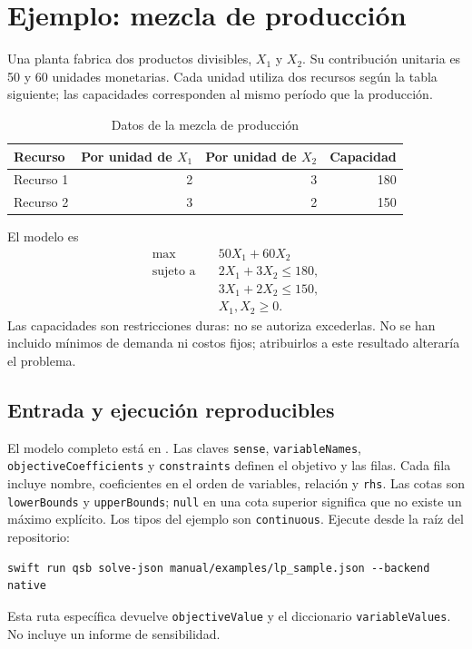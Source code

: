 \section{Ejemplo: mezcla de producción}
Una planta fabrica dos productos divisibles, \(X_1\) y \(X_2\). Su contribución
unitaria es 50 y 60 unidades monetarias. Cada unidad utiliza dos recursos según
la tabla siguiente; las capacidades corresponden al mismo período que la
producción.
\begin{table}[htbp]
\centering
\caption{Datos de la mezcla de producción}
\begin{tabular}{lrrr}
\toprule
Recurso & Por unidad de \(X_1\) & Por unidad de \(X_2\) & Capacidad \\
\midrule
Recurso 1 & 2 & 3 & 180 \\
Recurso 2 & 3 & 2 & 150 \\
\bottomrule
\end{tabular}
\end{table}
El modelo es
\[
\begin{aligned}
 \max\quad &50X_1+60X_2\\
 \text{sujeto a}\quad &2X_1+3X_2\leq180,\\
 &3X_1+2X_2\leq150,\\
 &X_1,X_2\geq0.
\end{aligned}
\]
Las capacidades son restricciones duras: no se autoriza excederlas. No se han
incluido mínimos de demanda ni costos fijos; atribuirlos a este resultado
alteraría el problema.

\subsection{Entrada y ejecución reproducibles}
El modelo completo está en . Las claves
\texttt{sense}, \texttt{variableNames}, \texttt{objectiveCoefficients} y
\texttt{constraints} definen el objetivo y las filas. Cada fila incluye nombre,
coeficientes en el orden de variables, relación y \texttt{rhs}. Las cotas son
\texttt{lowerBounds} y \texttt{upperBounds}; \texttt{null} en una cota superior
significa que no existe un máximo explícito. Los tipos del ejemplo son
\texttt{continuous}. Ejecute desde la raíz del repositorio:
\begin{lstlisting}
swift run qsb solve-json manual/examples/lp_sample.json --backend native
\end{lstlisting}
Esta ruta específica devuelve \texttt{objectiveValue} y el diccionario
\texttt{variableValues}. No incluye un informe de sensibilidad.

